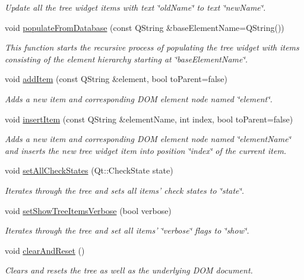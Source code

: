 \begin{DoxyCompactItemize}
\begin{DoxyCompactList}\small\item\em \-Update all the tree widget items with text \char`\"{}old\-Name\char`\"{} to text \char`\"{}new\-Name\char`\"{}. \end{DoxyCompactList}\item 
void \hyperlink{class_g_c_dom_tree_widget_a06ee56d0aa9348302dbb8d3f4e5bab44}{populate\-From\-Database} (const \-Q\-String \&base\-Element\-Name=\-Q\-String())
\begin{DoxyCompactList}\small\item\em \-This function starts the recursive process of populating the tree widget with items consisting of the element hierarchy starting at \char`\"{}base\-Element\-Name\char`\"{}. \end{DoxyCompactList}\item 
void \hyperlink{class_g_c_dom_tree_widget_adbbe1eeb6dc9a2d6c84a7133106a7f77}{add\-Item} (const \-Q\-String \&element, bool to\-Parent=false)
\begin{DoxyCompactList}\small\item\em \-Adds a new item and corresponding \-D\-O\-M element node named \char`\"{}element\char`\"{}. \end{DoxyCompactList}\item 
void \hyperlink{class_g_c_dom_tree_widget_a5e4117a9b47ac0bd520d32fc54d5f1ed}{insert\-Item} (const \-Q\-String \&element\-Name, int index, bool to\-Parent=false)
\begin{DoxyCompactList}\small\item\em \-Adds a new item and corresponding \-D\-O\-M element node named \char`\"{}element\-Name\char`\"{} and inserts the new tree widget item into position \char`\"{}index\char`\"{} of the current item. \end{DoxyCompactList}\item 
void \hyperlink{class_g_c_dom_tree_widget_ae61a0ae85b5d250c49ebc8cfc6c24d09}{set\-All\-Check\-States} (\-Qt\-::\-Check\-State state)
\begin{DoxyCompactList}\small\item\em \-Iterates through the tree and sets all items' check states to \char`\"{}state\char`\"{}. \end{DoxyCompactList}\item 
void \hyperlink{class_g_c_dom_tree_widget_a821fc62f1e29b67b3f6b00cd50de3bc8}{set\-Show\-Tree\-Items\-Verbose} (bool verbose)
\begin{DoxyCompactList}\small\item\em \-Iterates through the tree and set all items' \char`\"{}verbose\char`\"{} flags to \char`\"{}show\char`\"{}. \end{DoxyCompactList}\item 
void \hyperlink{class_g_c_dom_tree_widget_a3716c84a2a4fadc653cfac157caa215d}{clear\-And\-Reset} ()
\begin{DoxyCompactList}\small\item\em \-Clears and resets the tree as well as the underlying \-D\-O\-M document. \end{DoxyCompactList}\end{DoxyCompactItemize}
